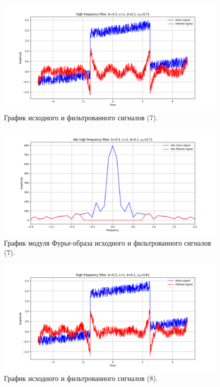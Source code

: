 \documentclass[a4paper, 12pt]{article}
\begin{document}
    \begin{figure}[!htb]
        \centering
        \includegraphics[scale=0.48]{7_u_flt_u_nolow.png}
        \captionsetup{skip=0pt}
        \caption{График исходного и фильтрованного сигналов (7).}
        \label{fig:fig39}
    \end{figure}
    \begin{figure}[!htb]
        \centering
        \includegraphics[scale=0.48]{7_abs_u_U_nolow.png}
        \captionsetup{skip=0pt}
        \caption{График модуля Фурье-образа исходного и фильтрованного сигналов (7).}
        \label{fig:fig40}
    \end{figure}
    \newpage
    \begin{figure}[!htb]
        \centering
        \includegraphics[scale=0.48]{8_u_flt_u_nolow.png}
        \captionsetup{skip=0pt}
        \caption{График исходного и фильтрованного сигналов (8).}
        \label{fig:fig41}
    \end{figure}
\end{document}
